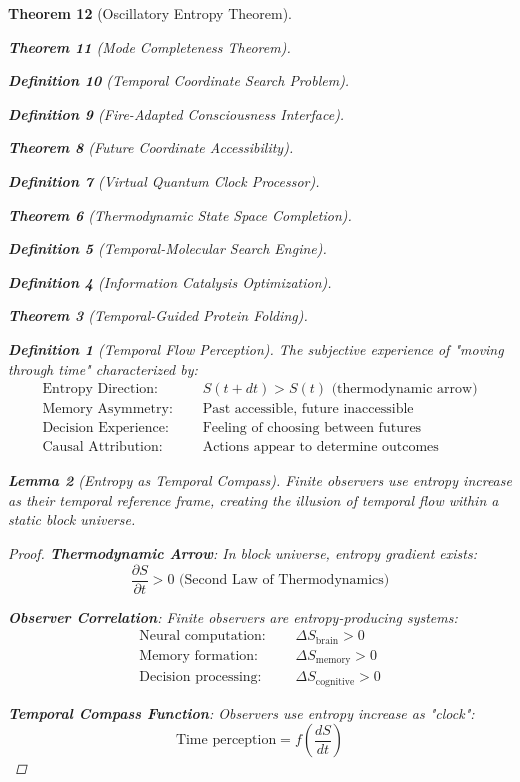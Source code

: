 \documentclass[12pt,a4paper]{article}
\newtheorem{theorem}{Theorem}[section]
\newtheorem{lemma}[theorem]{Lemma}
\newtheorem{definition}[theorem]{Definition}
\begin{document}
\begin{theorem}[Oscillatory Entropy Theorem]
\begin{theorem}[Mode Completeness Theorem]
\begin{enumerate}
\begin{definition}[Temporal Coordinate Search Problem]
\begin{algorithm}
\begin{definition}[Fire-Adapted Consciousness Interface]
\begin{theorem}[Future Coordinate Accessibility]
\begin{definition}[Virtual Quantum Clock Processor]
\begin{itemize}
\begin{itemize}
\begin{theorem}[Thermodynamic State Space Completion]
\begin{definition}[Temporal-Molecular Search Engine]
\begin{definition}[Information Catalysis Optimization]
\begin{algorithm}
\begin{theorem}[Temporal-Guided Protein Folding]
\begin{table}[h]
\begin{definition}[Temporal Flow Perception]
The subjective experience of "moving through time" characterized by:
\begin{align}
\text{Entropy Direction: } &\quad S(t+dt) > S(t) \text{ (thermodynamic arrow)} \\
\text{Memory Asymmetry: } &\quad \text{Past accessible, future inaccessible} \\
\text{Decision Experience: } &\quad \text{Feeling of choosing between futures} \\
\text{Causal Attribution: } &\quad \text{Actions appear to determine outcomes}
\end{align}
\end{definition}

\begin{lemma}[Entropy as Temporal Compass]
Finite observers use entropy increase as their temporal reference frame, creating the illusion of temporal flow within a static block universe.
\end{lemma}

\begin{proof}
\textbf{Thermodynamic Arrow}: In block universe, entropy gradient exists:
$$\frac{\partial S}{\partial t} > 0 \text{ (Second Law of Thermodynamics)}$$

\textbf{Observer Correlation}: Finite observers are entropy-producing systems:
\begin{align}
\text{Neural computation: } &\quad \Delta S_{\text{brain}} > 0 \\
\text{Memory formation: } &\quad \Delta S_{\text{memory}} > 0 \\
\text{Decision processing: } &\quad \Delta S_{\text{cognitive}} > 0
\end{align}

\textbf{Temporal Compass Function}: Observers use entropy increase as "clock":
$$\text{Time perception} = f\left(\frac{dS}{dt}\right)$$


\end{proof}
\end{table}
\end{theorem}
\end{algorithm}
\end{definition}
\end{definition}
\end{theorem}
\end{itemize}
\end{itemize}
\end{definition}
\end{theorem}
\end{definition}
\end{algorithm}
\end{definition}
\end{enumerate}
\end{theorem}
\end{theorem}
\end{document}

